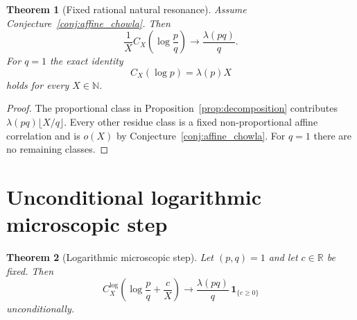 \documentclass[preprint,12pt]{elsarticle}
\numberwithin{equation}{section}
\theoremstyle{plain}
\newtheorem{theorem}{Theorem}[section]
\theoremstyle{definition}
\theoremstyle{remark}
\begin{document}
\begin{theorem}[Fixed rational natural resonance]
\label{thm:fixed}
Assume Conjecture~\ref{conj:affine_chowla}. Then
\[
\frac1X C_X\!\left(\log\frac pq\right)\longrightarrow\frac{\lambda(pq)}q.
\]
For $q=1$ the exact identity
\[
C_X(\log p)=\lambda(p)X
\]
holds for every $X\in\mathbb N$.
\end{theorem}

\begin{proof}
The proportional class in Proposition~\ref{prop:decomposition} contributes
$\lambda(pq)\lfloor X/q\rfloor$. Every other residue class is a fixed
non-proportional affine correlation and is $o(X)$ by
Conjecture~\ref{conj:affine_chowla}. For $q=1$ there are no remaining
classes.
\end{proof}

\section{Unconditional logarithmic microscopic step}
\label{sec:logstep}

\begin{theorem}[Logarithmic microscopic step]
\label{thm:logstep}
Let $(p,q)=1$ and let $c\in\mathbb R$ be fixed. Then
\begin{equation}
C_X^{\log}\!\left(\log\frac pq+\frac cX\right)
\longrightarrow
\frac{\lambda(pq)}q\,\mathbf 1_{\{c\ge0\}}
\label{eq:logstep}
\end{equation}
unconditionally.
\end{theorem}
\end{document}
